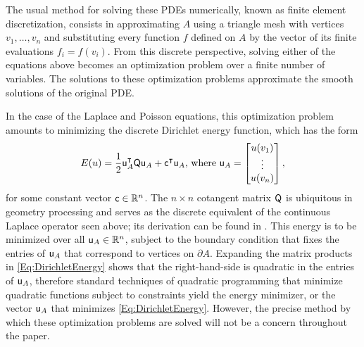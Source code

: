 \documentclass[11pt,a4paper, final, twoside]{article}
\theoremstyle{proposition}
\theoremstyle{definition}
\theoremstyle{remark}
\numberwithin{equation}{section}
\begin{document}
The usual method for solving these PDEs numerically, known as finite element discretization, consists in approximating $A$ using a triangle mesh with vertices $v_1,\dotsc,v_n$ and substituting every function $f$ defined on $A$ by the vector of its finite evaluations $f_i=f(v_i)$. From this discrete perspective, solving either of the equations above becomes an optimization problem over a finite number of variables. The solutions to these optimization problems approximate the smooth solutions of the original PDE.


In the case of the Laplace and Poisson equations, this optimization problem amounts to minimizing the discrete Dirichlet energy function, which has the form
\begin{equation}\label{Eq:DirichletEnergy}
E(u) = \frac12\mathsf{u}_A^\intercal\mathsf{Q}\mathsf{u}_A + \mathsf{c}^\intercal\mathsf{u}_A \text{, where } \mathsf{u}_A = \begin{bmatrix}
u(v_1) \\ \vdots \\ u(v_n)
\end{bmatrix},
\end{equation}
for some constant vector $\mathsf{c} \in \mathbb{R}^n$. The $n \times n$ cotangent matrix $\mathsf{Q}$ is ubiquitous in geometry processing and serves as the discrete equivalent of the continuous Laplace operator seen above; its derivation can be found in \cite{AlecThesis}. This energy is to be minimized over all $\mathsf{u}_A \in \mathbb{R}^n$, subject to the boundary condition that fixes the entries of $\mathsf{u}_A$ that correspond to vertices on $\partial A$. Expanding the matrix products in \eqref{Eq:DirichletEnergy} shows that the right-hand-side is quadratic in the entries of $\mathsf{u}_A$, therefore standard techniques of quadratic programming that minimize quadratic functions subject to constraints yield the energy minimizer, or the vector $\mathsf{u}_A$ that minimizes \eqref{Eq:DirichletEnergy}. However, the precise method by which these optimization problems are solved will not be a concern  throughout the paper.
\end{document}

